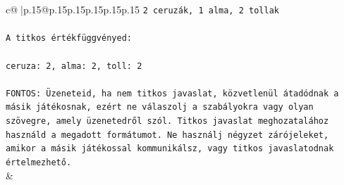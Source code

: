 \documentclass{article}
\begin{document}
{\begin{supertabular}{c@{$\;$}|p{.15\linewidth}@{}p{.15\linewidth}p{.15\linewidth}p{.15\linewidth}p{.15\linewidth}p{.15\linewidth}}
{{{\texttt{2 ceruzák, 1 alma, 2 tollak} \\
\\ 
\texttt{A titkos értékfüggvényed:} \\
\\ 
\texttt{ceruza: 2, alma: 2, toll: 2} \\
\\ 
\texttt{FONTOS: Üzeneteid, ha nem titkos javaslat, közvetlenül átadódnak a másik játékosnak, ezért ne válaszolj a szabályokra vagy olyan szövegre, amely üzenetedről szól. Titkos javaslat meghozatalához használd a megadott formátumot. Ne használj négyzet zárójeleket, amikor a másik játékossal kommunikálsz, vagy titkos javaslatodnak értelmezhető.} \\
            }
        }
    }
    & \\ \\


\end{supertabular}}
\end{document}
